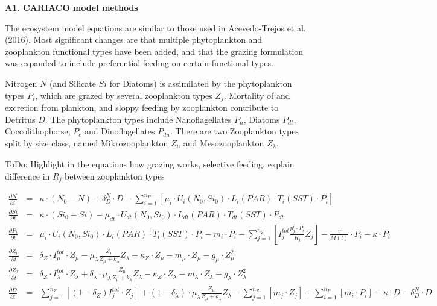 \documentclass[11pt,letterpaper,english]{article}
\begin{document}
\newcommand{\etal}{{\em et al.}}
\newcommand{\ux}{{\underline{x}}}
\newcommand{\tdt}{{t}} 

{\bf {\large A1. CARIACO model methods}} 

The ecosystem model equations are similar to those used in Acevedo-Trejos et al. (2016).
Most significant changes are that multiple phytoplankton and zooplankton functional types have been added, and that the grazing formulation was expanded to include preferential feeding on certain functional types.

Nitrogen $N$ (and Silicate $Si$ for Diatoms) is assimilated by the phytoplankton types $P_i$, which are grazed by several zooplankton types $Z_j$. Mortality of and excretion from plankton, and sloppy feeding by zooplankton contribute to Detritus $D$. The phytoplankton types include Nanoflagellates $P_{n}$, Diatoms $P_{dt}$, Coccolithophorse, $P_{c}$ and Dinoflagellates $P_{dn}$. There are two Zooplankton types split by size class, named Mikrozooplankton $Z_{\mu}$ and Mesozooplankton $Z_{\lambda}$.

ToDo:  
Highlight in the equations how grazing works, selective feeding, explain difference in $R_j$ between zooplankton types

\begin{eqnarray}
\frac{\partial N}{\partial t} & = & 
\kappa \cdot \left(N_{0} - N\right) + 
\delta^{N}_{D} \cdot D -
\sum_{i=1}^{n_P} [\mu_i \cdot U_{i}(N_0,Si_0)\cdot L_i(PAR)\cdot T_i(SST) \cdot P_{i}] 
\nonumber \\
\frac{\partial Si}{\partial t} & = & 
\kappa \cdot \left(Si_{0} - Si\right) 
- \mu_{dt} \cdot U_{dt}(N_0,Si_0) \cdot L_{dt}(PAR)\cdot T_{dt}(SST) \cdot P_{dt}
\nonumber \\
\frac{\partial P_{i}}{\partial t} & = & 
\mu_{i} \cdot U_{i}(N_0,Si_0)\cdot L_{i}(PAR)\cdot T_{i}(SST) \cdot P_{i}
- m_{i} \cdot P_{i}
- \sum_{j=1}^{n_Z} [I^{tot}_j \frac{p^i_{j} \cdot P_{i}} {R_{j}} Z_{j}] -
\frac{v}{M(t)} \cdot P_{i} -
\kappa \cdot P_{i}
\nonumber \\
\frac{\partial Z_{\mu}}{\partial t} & = & 
\delta_Z \cdot I^{tot}_{\mu} \cdot Z_{\mu}-
\mu^{}_{\lambda} \frac{Z_{\mu}}{Z_{\mu}+k_{\lambda}} Z_{\lambda}-
\kappa_{Z} \cdot Z_{\mu} -
m_{\mu} \cdot Z_{\mu} - 
g_{\mu} \cdot Z_{\mu}^{2}
\nonumber \\
\frac{\partial Z_{\lambda}}{\partial t} & = & 
\delta_Z \cdot I^{tot}_{\lambda} \cdot Z_{\lambda}+
\delta_{\lambda} \cdot \mu^{}_{\lambda} \frac{Z_{\mu}}{Z_{\mu}+k_{\lambda}} Z_{\lambda}-
\kappa_{Z} \cdot Z_{\lambda} -
m_{\lambda} \cdot Z_{\lambda} - 
g_{\lambda} \cdot Z_{\lambda}^{2}
\nonumber \\
\frac{\partial D}{\partial t} & = & 
\sum_{j=1}^{n_Z} [(1-\delta_Z) I^{tot}_j \cdot Z_{j}] +
(1-\delta_{\lambda}) \cdot \mu^{}_{\lambda} \frac{Z_{\mu}}{Z_{\mu}+k_{\lambda}} Z_{\lambda}-
\sum_{j=1}^{n_Z} [m_j \cdot Z_{j}] +
\sum_{i=1}^{n_P} [m_i \cdot P_{i}] -
\kappa \cdot D -
\delta^{N}_{D} \cdot D
\nonumber
\end{eqnarray}
 
\end{document}
